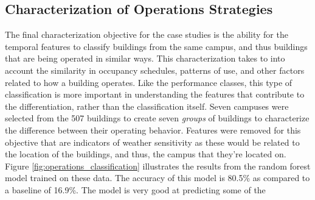 \subsection{Characterization of Operations Strategies}
\label{sec:operations_strategies}

The final characterization objective for the case studies is the ability for the temporal features to classify buildings from the same campus, and thus buildings that are being operated in similar ways. This characterization takes to into account the similarity in occupancy schedules, patterns of use, and other factors related to how a building operates. Like the performance classes, this type of classification is more important in understanding the features that contribute to the differentiation, rather than the classification itself. Seven campuses were selected from the 507 buildings to create seven \emph{groups} of buildings to characterize the difference between their operating behavior. Features were removed for this objective that are indicators of weather sensitivity as these would be related to the location of the buildings, and thus, the campus that they're located on. Figure \ref{fig:operations_classification} illustrates the results from the random forest model trained on these data. The accuracy of this model is 80.5\% as compared to a baseline of 16.9\%. The model is very good at predicting some of the 